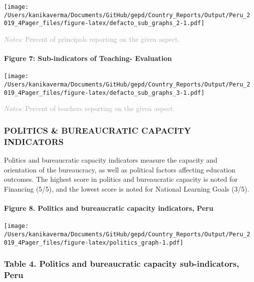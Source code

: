 \documentclass[twocolumn]{article}
\let\oldparagraph\paragraph
\renewcommand{\paragraph}[1]{\oldparagraph{#1}\mbox{}}
\begin{document}
\texttt{[image: /Users/kanikaverma/Documents/GitHub/gepd/Country\_Reports/Output/Peru\_2019\_4Pager\_files/figure-latex/defacto\_sub\_graphs\_2-1.pdf]}

{\scriptsize
    \textcolor{darkgray}{\textit{Notes:} Percent of principals reporting on the given aspect.}
  }

\hypertarget{figure-7-sub-indicators-of-teaching--evaluation}{%
\paragraph{Figure 7: Sub-indicators of Teaching-
Evaluation}\label{figure-7-sub-indicators-of-teaching--evaluation}}

\texttt{[image: /Users/kanikaverma/Documents/GitHub/gepd/Country\_Reports/Output/Peru\_2019\_4Pager\_files/figure-latex/defacto\_sub\_graphs\_3-1.pdf]}

{\scriptsize
    \textcolor{darkgray}{\textit{Notes:} Percent of teachers reporting on the given aspect.}
  }

\vfill\null

\hypertarget{politics-bureaucratic-capacity-indicators}{%
\subsubsection{\texorpdfstring{\textbf{POLITICS \& BUREAUCRATIC CAPACITY
INDICATORS}}{POLITICS \& BUREAUCRATIC CAPACITY INDICATORS}}\label{politics-bureaucratic-capacity-indicators}}

Politics and bureaucratic capacity indicators measure the capacity and
orientation of the bureaucracy, as well as political factors affecting
education outcomes. The highest score in politics and bureaucratic
capacity is noted for Financing (5/5), and the lowest score is noted for
National Learning Goals (3/5).

\hypertarget{figure-8.-politics-and-bureaucratic-capacity-indicators-peru}{%
\paragraph{Figure 8. Politics and bureaucratic capacity indicators,
Peru}\label{figure-8.-politics-and-bureaucratic-capacity-indicators-peru}}

\texttt{[image: /Users/kanikaverma/Documents/GitHub/gepd/Country\_Reports/Output/Peru\_2019\_4Pager\_files/figure-latex/politics\_graph-1.pdf]}

\hypertarget{table-4.-politics-and-bureaucratic-capacity-sub-indicators-peru}{%
\subsubsection{Table 4. Politics and bureaucratic capacity
sub-indicators,
Peru}\label{table-4.-politics-and-bureaucratic-capacity-sub-indicators-peru}}
\end{document}
